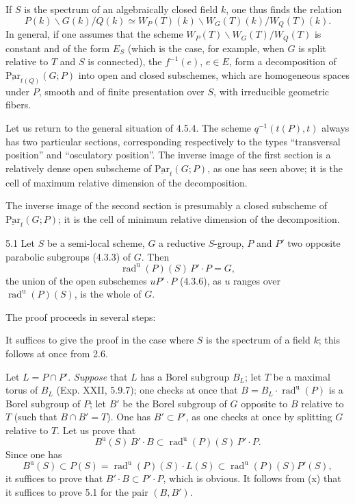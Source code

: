 If $S$ is the spectrum of an algebraically closed field $k$, one thus finds the relation
\[
 P(k)\backslash G(k)/Q(k)\simeq W_P(T)(k)\backslash W_G(T)(k)/W_Q(T)(k).
\]
In general, if one assumes that the scheme $W_P(T)\backslash W_G(T)/W_Q(T)$ is constant and of the form $E_S$ (which is the case, for example, when $G$ is split relative to $T$ and $S$ is connected), the $f^{-1}(e)$, $e\in E$, form a decomposition of $\underline{\mathrm{Par}}_{t(Q)}(G;P)$ into open and closed subschemes, which are homogeneous spaces under $P$, smooth and of finite presentation over $S$, with irreducible geometric fibers.

\label{XXVI.4.5.6}
Let us return to the general situation of 4.5.4. The scheme $q^{-1}(t(P),t)$ always has two particular sections, corresponding respectively to the types ``transversal position'' and ``osculatory position''. The inverse image of the first section is a relatively dense open subscheme of $\underline{\mathrm{Par}}_t(G;P)$, as one has seen above; it is the cell of maximum relative dimension of the decomposition.

The inverse image of the second section is presumably a closed subscheme of $\underline{\mathrm{Par}}_t(G;P)$; it is the cell of minimum relative dimension of the decomposition.

\begin{theorem}{5.1}\label{XXVI.5.1}
Let $S$ be a semi-local scheme, $G$ a reductive $S$-group, $P$ and $P'$ two opposite parabolic subgroups (4.3.3) of $G$. Then
\[
 \operatorname{rad}^{\mathrm u}(P)(S)\,P'\cdot P=G,
\]
\ie the union of the open subschemes $uP'\cdot P$ (4.3.6), as $u$ ranges over $\operatorname{rad}^{\mathrm u}(P)(S)$, is the whole of $G$.
\end{theorem}
The proof proceeds in several steps:

\label{XXVI.5.1.1}
It suffices to give the proof in the case where $S$ is the spectrum of a field $k$; this follows at once from 2.6.

\label{XXVI.5.1.2}
Let $L=P\cap P'$. \emph{Suppose} that $L$ has a Borel subgroup $B_L$; let $T$ be a maximal torus of $B_L$ (Exp. XXII, 5.9.7); one checks at once that $B=B_L\cdot\operatorname{rad}^{\mathrm u}(P)$ is a Borel subgroup of $P$; let $B'$ be the Borel subgroup of $G$ opposite to $B$ relative to $T$ (\ie such that $B\cap B'=T$). One has $B'\subset P'$, as one checks at once by splitting $G$ relative to $T$. Let us prove that
\begin{equation}\tag{x}
 B^{\mathrm u}(S)\,B'\cdot B\subset\operatorname{rad}^{\mathrm u}(P)(S)\,P'\cdot P.
\end{equation}
Since one has
\[
 B^{\mathrm u}(S)\subset P(S)=\operatorname{rad}^{\mathrm u}(P)(S)\cdot L(S)
 \subset\operatorname{rad}^{\mathrm u}(P)(S)P'(S),
\]
it suffices to prove that $B'\cdot B\subset P'\cdot P$, which is obvious. It follows from (x) that it suffices to prove 5.1 for the pair $(B,B')$.

